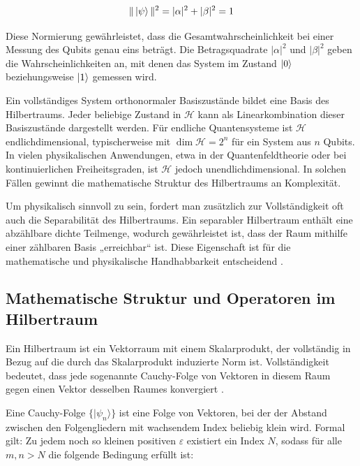 \[
\| \ket{\psi} \|^2 = |\alpha|^2 + |\beta|^2 = 1
\]

Diese Normierung gewährleistet, dass die Gesamtwahrscheinlichkeit bei einer Messung des Qubits genau eins beträgt. Die Betragsquadrate \( |\alpha|^2 \) und \( |\beta|^2 \) geben die Wahrscheinlichkeiten an, mit denen das System im Zustand \( \ket{0} \) beziehungsweise \( \ket{1}  \) gemessen wird.

Ein vollständiges System orthonormaler Basiszustände bildet eine Basis des Hilbertraums. Jeder beliebige Zustand in \( \mathcal{H} \) kann als Linearkombination dieser Basiszustände dargestellt werden. Für endliche Quantensysteme ist \( \mathcal{H} \) endlichdimensional, typischerweise mit \( \dim \mathcal{H} = 2^n \) für ein System aus \( n \) Qubits. In vielen physikalischen Anwendungen, etwa in der Quantenfeldtheorie oder bei kontinuierlichen Freiheitsgraden, ist \( \mathcal{H} \) jedoch unendlichdimensional. In solchen Fällen gewinnt die mathematische Struktur des Hilbertraums an Komplexität.

Um physikalisch sinnvoll zu sein, fordert man zusätzlich zur Vollständigkeit oft auch die Separabilität des Hilbertraums. Ein separabler Hilbertraum enthält eine abzählbare dichte Teilmenge, wodurch gewährleistet ist, dass der Raum mithilfe einer zählbaren Basis „erreichbar“ ist. Diese Eigenschaft ist für die mathematische und physikalische Handhabbarkeit entscheidend \cite{nolting_springer_2013}.  %

\subsection{Mathematische Struktur und Operatoren im Hilbertraum}
\label{subsec:Mathematische Struktur und Operatoren im Hilbertraum}

Ein Hilbertraum ist ein Vektorraum mit einem Skalarprodukt, der vollständig in Bezug auf die durch das Skalarprodukt induzierte Norm ist. Vollständigkeit bedeutet, dass jede sogenannte Cauchy-Folge von Vektoren in diesem Raum gegen einen Vektor desselben Raumes konvergiert \cite{nolting_springer_2013}.

Eine Cauchy-Folge \( \{ |\psi_n\rangle \} \) ist eine Folge von Vektoren, bei der der Abstand zwischen den Folgengliedern mit wachsendem Index beliebig klein wird. Formal gilt: Zu jedem noch so kleinen positiven \( \varepsilon \) existiert ein Index \( N \), sodass für alle \( m,n > N \) die folgende Bedingung erfüllt ist:

